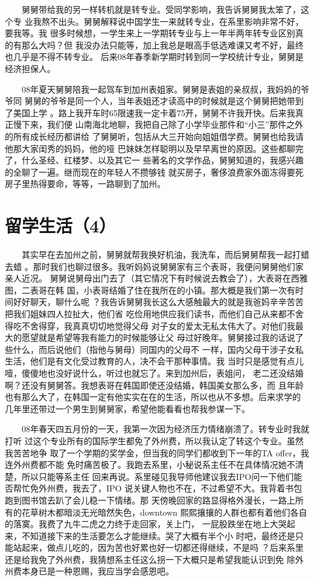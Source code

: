 \documentclass[12pt]{book}
\begin{document}
　　舅舅带给我的另一样转机就是转专业。受同学影响，我告诉舅舅我太笨了，这个专
业我熬不出头。舅舅解释说中国学生一来就转专业，在系里影响非常不好，要我等。我
很多时候想，一学生来上一学期转专业与上一年半两年转专业区别真的有那么大吗？但
我没办法只能等，加上我总是眼高手低选难课又考不好，最终也几乎是不得不转专业。
后来08年春季新学期时转到同一学校统计专业，舅舅是经济担保人。

　　08年夏天舅舅陪我一起驾车到加州表姐家。舅舅是表姐的亲叔叔，我妈妈的爷爷同
舅舅的爷爷是同一个人，当年表姐还才读高中的时候就是这个舅舅把她带到了美国上学
。路上我开车时65限速我一定卡着75开，舅舅不许我开快。后来我真正慢下来，我们便
山南海北地聊，我把自己除了小学毕业那件和“小三”那件之外的所有成长经历都讲给
了舅舅听，包括从大三开始向姐姐借学费。舅舅也给我请他那大家闺秀的妈妈，他的哑
巴妹妹怎样聪明以及早早离世的原因。这些都聊完了，什么圣经、红楼梦、以及其它一
些著名的文学作品，舅舅知道的，我感兴趣的全聊了一遍。继而现在的年轻人不攒够钱
就买房子，奢侈浪费家外面冻得要死房子里热得要命，等等，一路聊到了加州。
\section{留学生活（4）}
\label{sec-6-4}

　　其实早在去加州之前，舅舅就帮我换好机油，我洗车，而后舅舅帮我一起打蜡去蜡
。那时我们也聊过很多。我听妈妈说舅舅家有三个表哥，我便问舅舅他们家亲人近况。
舅舅说舅母出门去了（其它情况下有时候说去教会了），大表哥在西雅图，二表哥在韩
国，小表哥结婚了住在我所在的小镇。那大概是我们第一次有时间好好聊天，聊什么呢
？我告诉舅舅我长这么大感触最大的就是我爸妈辛辛苦苦把我们姐妹四人拉扯大，他们省
吃俭用地供应我们读书，而他们自己从来都不舍得吃不舍得穿，我真真切切地觉得父母
对子女的爱太无私太伟大了。对他们我最大的愿望就是希望等我有能力的时候能够让父
母过好晚年。舅舅接过我的话说了些什么，而后说他们（指他与舅母）同国内的父母不
一样，国内父母干涉子女私生活，他们是有文化受过教育的人，决不会干那种事情。我
当时只是感觉有点儿噎，傻傻地也没好说什么，听过也就忘了。来到加州后，表姐问，
老二还没结婚啊？还没有舅舅答。我想表哥在韩国即使还没结婚，韩国美女那么多，而
且年龄也有那么大了，在韩国一定有他实实在在的生活，所以也从不多想。后来求学的
几年里还带过一个男生到舅舅家，希望他能看看也帮我参谋一下。

　　08年春天四五月份的一天，我第一次因为经济压力情绪崩溃了。转专业时我就打听
过这个专业所有的国际学生都免了外州费，所以我认定了转这个专业。虽然我苦苦地争
取了一个学期的奖学金，但当我的同学们都收到下一年的TA offer，我连外州费都不能
免时痛苦极了。我跑去系里，小秘说系主任不在具体情况她不清楚，所以只能等系主任
回来再说。系里碰见我导师他建议我去IPO问一下他们能否帮忙免外州费，我去了，IPO
说关键人物也不在，不过希望不大。我背着书包跑到图书馆去趴了会儿稳一下情绪。那
天傍晚回家的路显得格外漫长，一路上所有的花草树木都暗淡无光暗然失色，downtown
熙熙攘攘的人群也都有着他们各自的落寞。我费了九牛二虎之力终于走回家，关上门，
一屁股跌坐在地上大哭起来，不知道接下来的生活要怎么才能继续。哭了大概有半个小
时吧，最终还是只能站起来，做点儿吃的，因为苦也好累也好一切都还得继续，不是吗
？后来系里还是给我免了外州费，我猜想系主任这么拐一下大概只是希望我能认识到免
除外州费本身已是一种恩赐，我应当学会感恩吧。
\end{document}
